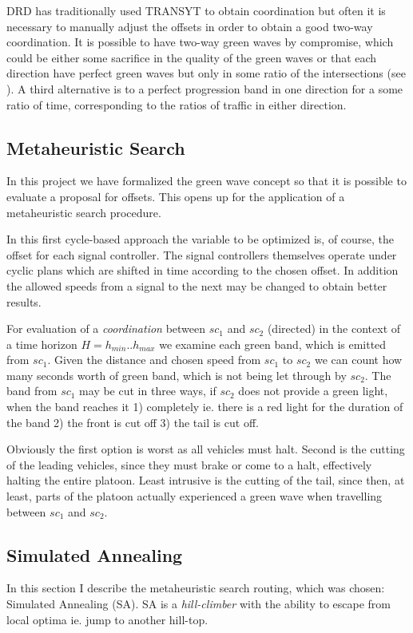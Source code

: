 DRD has traditionally used TRANSYT to obtain coordination but often it is necessary to manually adjust the offsets in order to obtain a good two-way coordination. It is possible to have two-way green waves by compromise, which could be either some sacrifice in the quality of the green waves or that each direction have perfect green waves but only in some ratio of the intersections (see \cite{artc}). A third alternative is to a perfect progression band in one direction for a some ratio of time, corresponding to the ratios of traffic in either direction.

\subsection{Metaheuristic Search}

In this project we have formalized the green wave concept so that it is possible to evaluate a proposal for offsets. This opens up for the application of a metaheuristic search procedure.

In this first cycle-based approach the variable to be optimized is, of course, the offset for each signal controller. The signal controllers themselves operate under cyclic plans which are shifted in time according to the chosen offset. In addition the allowed speeds from a signal to the next may be changed to obtain better results.

\label{eval_coord}
For evaluation of a \textit{coordination} between $sc_1$ and $sc_2$ (directed) in the context of a time horizon $H = h_{min} .. h_{max}$ we examine each green band, which is emitted from $sc_1$. Given the distance and chosen speed from $sc_1$ to $sc_2$ we can count how many seconds worth of green band, which is not being let through by $sc_2$. The band from $sc_1$ may be cut in three ways, if $sc_2$ does not provide a green light, when the band reaches it 1) completely ie. there is a red light for the duration of the band 2) the front is cut off 3) the tail is cut off.

Obviously the first option is worst as all vehicles must halt. Second is the cutting of the leading vehicles, since they must brake or come to a halt, effectively halting the entire platoon. Least intrusive is the cutting of the tail, since then, at least, parts of the platoon actually experienced a green wave when travelling between $sc_1$ and $sc_2$.

\subsection*{Simulated Annealing}
In this section I describe the metaheuristic search routing, which was chosen: Simulated Annealing (SA). 
SA is a \textit{hill-climber} with the ability to escape from local optima ie. jump to another hill-top.

